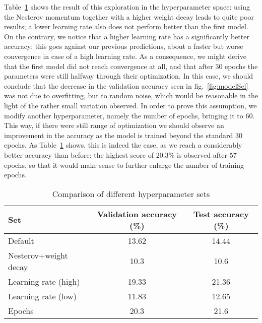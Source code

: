 \documentclass[11pt,twoside,a4paper]{article}
\begin{document}
Table~\ref{tab:hyperparams1} shows the result of this exploration in the hyperparameter space: using the Nesterov momentum together with a higher weight decay leads to quite poor results; a lower learning rate also does not perform better than the first model. On the contrary, we notice that a higher learning rate has a significantly better accuracy: this goes against our previous predictions, about a faster but worse convergence in case of a high learning rate.\newline
As a consequence, we might derive that the first model did not reach convergence at all, and that after 30 epochs the parameters were still halfway through their optimization. In this case, we should conclude that the decrease in the validation accuracy seen in fig.~\ref{fig:modelSel} was not due to overfitting, but to random noise, which would be reasonable in the light of the rather small variation observed. In order to prove this assumption, we modify another hyperparameter, namely the number of epochs, bringing it to 60. This way, if there were still range of optimization we should observe an improvement in the accuracy as the model is trained beyond the standard 30 epochs.\newline
As Table~\ref{tab:hyperparams1} shows, this is indeed the case, as we reach a considerably better accuracy than before: the highest score of 20.3\% is observed after 57 epochs, so that it would make sense to further enlarge the number of training epochs.

\begin{table}[]
  \begin{adjustwidth}{-.5in}{-.5in}
  \begin{center}
    \begin{tabular}{l | c | c}
       Set & Validation accuracy (\%) & Test accuracy (\%) \\
      \hline
	Default & 13.62 & 14.44\\
	Nesterov+weight decay & 10.3 & 10.6\\
	Learning rate (high) & 19.33 & 21.36\\
	Learning rate (low) & 11.83 & 12.65\\
	Epochs & 20.3 & 21.6\\
    \end{tabular}
    \caption{Comparison of different hyperparameter sets}
    \label{tab:hyperparams1}
  \end{center}
  \end{adjustwidth}
\end{table}
\end{document}
